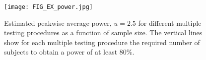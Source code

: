 


\begin{figure}
\begin{center}
\texttt{[image: FIG\_EX\_power.jpg]}
\caption{Estimated peakwise average power, $u=2.5$ for different multiple testing procedures as a function of sample size.  The vertical lines show for each multiple testing procedure the required number of subjects to obtain a power of at least 80\%. \label{EX_power}}
\end{center}
\end{figure}

